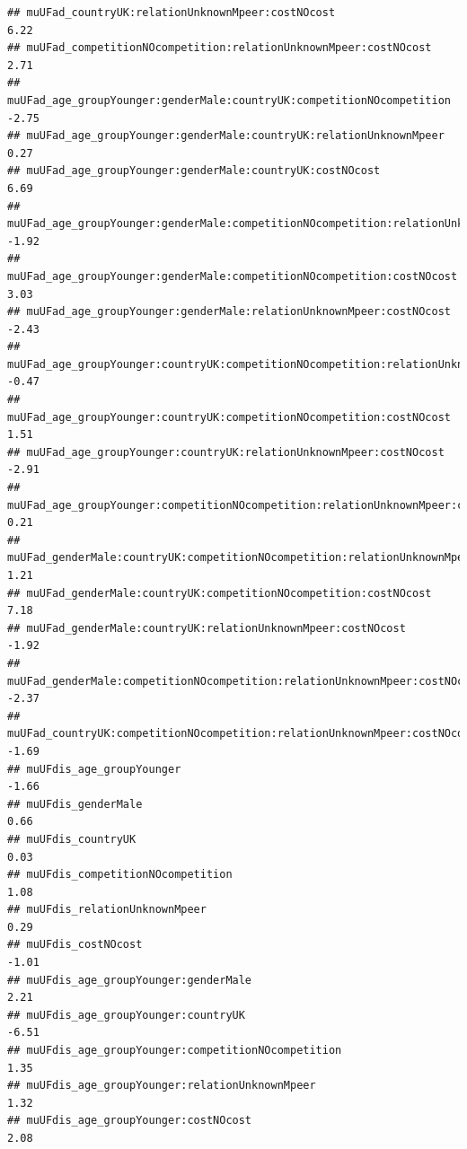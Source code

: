 \documentclass[
]{article}
\begin{document}
\begin{verbatim}
## muUFad_countryUK:relationUnknownMpeer:costNOcost                                      6.22
## muUFad_competitionNOcompetition:relationUnknownMpeer:costNOcost                       2.71
## muUFad_age_groupYounger:genderMale:countryUK:competitionNOcompetition                -2.75
## muUFad_age_groupYounger:genderMale:countryUK:relationUnknownMpeer                     0.27
## muUFad_age_groupYounger:genderMale:countryUK:costNOcost                               6.69
## muUFad_age_groupYounger:genderMale:competitionNOcompetition:relationUnknownMpeer     -1.92
## muUFad_age_groupYounger:genderMale:competitionNOcompetition:costNOcost                3.03
## muUFad_age_groupYounger:genderMale:relationUnknownMpeer:costNOcost                   -2.43
## muUFad_age_groupYounger:countryUK:competitionNOcompetition:relationUnknownMpeer      -0.47
## muUFad_age_groupYounger:countryUK:competitionNOcompetition:costNOcost                 1.51
## muUFad_age_groupYounger:countryUK:relationUnknownMpeer:costNOcost                    -2.91
## muUFad_age_groupYounger:competitionNOcompetition:relationUnknownMpeer:costNOcost      0.21
## muUFad_genderMale:countryUK:competitionNOcompetition:relationUnknownMpeer             1.21
## muUFad_genderMale:countryUK:competitionNOcompetition:costNOcost                       7.18
## muUFad_genderMale:countryUK:relationUnknownMpeer:costNOcost                          -1.92
## muUFad_genderMale:competitionNOcompetition:relationUnknownMpeer:costNOcost           -2.37
## muUFad_countryUK:competitionNOcompetition:relationUnknownMpeer:costNOcost            -1.69
## muUFdis_age_groupYounger                                                             -1.66
## muUFdis_genderMale                                                                    0.66
## muUFdis_countryUK                                                                     0.03
## muUFdis_competitionNOcompetition                                                      1.08
## muUFdis_relationUnknownMpeer                                                          0.29
## muUFdis_costNOcost                                                                   -1.01
## muUFdis_age_groupYounger:genderMale                                                   2.21
## muUFdis_age_groupYounger:countryUK                                                   -6.51
## muUFdis_age_groupYounger:competitionNOcompetition                                     1.35
## muUFdis_age_groupYounger:relationUnknownMpeer                                         1.32
## muUFdis_age_groupYounger:costNOcost                                                   2.08

\end{verbatim}
\end{document}
